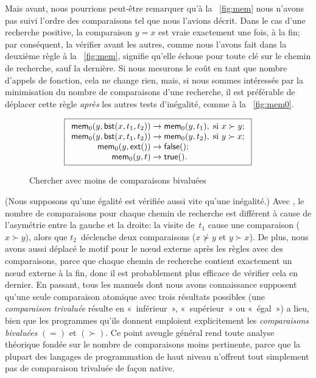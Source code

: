 Mais avant, nous pourrions peut-être remarquer qu'à la
\fig~\vref{fig:mem} nous n'avons pas suivi l'ordre des comparaisons
tel que nous l'avions décrit. Dans le cas d'une recherche positive, la
comparaison \(y = x\) est vraie exactement une fois, à la fin; par
conséquent, la vérifier avant les autres, comme nous l'avons fait dans
la deuxième règle à la \fig~\vref{fig:mem}, signifie qu'elle échoue
pour toute clé sur le chemin de recherche, sauf la dernière. Si nous
mesurons le coût en tant que nombre d'appels de fonction, cela ne
change rien, mais, si nous sommes intéressés par la minimisation du
nombre de comparaisons d'une recherche, il est préférable de déplacer
cette règle \emph{après} les autres tests d'inégalité, comme à la
\fig~\vref{fig:mem0}.
\begin{figure}
\begin{equation*}
\boxed{
\begin{array}{r@{\;}l@{\;}l}
\fun{mem}_0(y,\fun{bst}(x,t_1,t_2)) & \rightarrow &
  \fun{mem}_0(y,t_1), \; \text{si \(x \succ y\)};\\
\fun{mem}_0(y,\fun{bst}(x,t_1,t_2)) & \rightarrow &
  \fun{mem}_0(y,t_2),\; \text{si \(y \succ x\)};\\
\fun{mem}_0(y,\fun{ext}()) & \rightarrow & \fun{false}();\\
\fun{mem}_0(y,t) & \rightarrow & \fun{true}().
\end{array}}
\end{equation*}
\caption{Chercher avec moins de comparaisons bivaluées}
\label{fig:mem0}
\end{figure}
(Nous supposons qu'une égalité est vérifiée aussi vite qu'une
inégalité.) Avec , le
nombre de comparaisons pour chaque chemin de recherche est différent à
cause de l'asymétrie entre la gauche et la droite: la visite
de~\(t_1\) cause une comparaison (\(x \succ y\)), alors que
\(t_2\)~déclenche deux comparaisons (\(x \nsucc y\) et \(y \succ
x\)). De plus, nous avons aussi déplacé le motif pour le n{\oe}ud
externe après les règles avec des comparaisons, parce que chaque
chemin de recherche contient exactement un n{\oe}ud externe à la fin,
donc il est probablement plus efficace de vérifier cela en dernier. En
passant, tous les manuels dont nous avons connaissance supposent
qu'une seule comparaison atomique avec trois résultats possibles (une
\emph{comparaison trivaluée} résulte en «~inférieur~», «~supérieur~» ou
«~égal~») a lieu, bien que les programmes qu'ils donnent emploient
explicitement les \emph{comparaisons bivaluées} \((=)\) et
\((\succ)\). Ce point aveugle général rend toute analyse théorique
fondée sur le nombre de comparaisons moins pertinente, parce que la
plupart des langages de programmation de haut niveau n'offrent tout
simplement pas de comparaison trivaluée de façon native.

